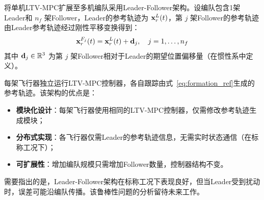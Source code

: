 将单机LTV-MPC扩展至多机编队采用Leader-Follower架构。设编队包含1架Leader和 $n_f$ 架Follower，Leader的参考轨迹为 $\mathbf{x}_{r}^{L}(t)$，第 $j$ 架Follower的参考轨迹由Leader参考轨迹经过刚性平移变换得到：
\begin{equation}\label{eq:formation_ref}
\mathbf{x}_{r}^{F_j}(t) = \mathbf{x}_{r}^{L}(t) + \mathbf{d}_j, \quad j = 1, \ldots, n_f
\end{equation}
其中 $\mathbf{d}_j \in \mathbb{R}^3$ 为第 $j$ 架Follower相对于Leader的期望位置偏移量（在惯性系中定义）。

每架飞行器独立运行LTV-MPC控制器，各自跟踪由式~\eqref{eq:formation_ref}生成的参考轨迹。该架构的优点是：
\begin{itemize}[leftmargin=*]
    \item \textbf{模块化设计}：每架飞行器使用相同的LTV-MPC控制器，仅需修改参考轨迹生成模块；
    \item \textbf{分布式实现}：各飞行器仅需Leader的参考轨迹信息，无需实时状态通信（在标称工况下）；
    \item \textbf{可扩展性}：增加编队规模只需增加Follower数量，控制器结构不变。
\end{itemize}

需要指出的是，Leader-Follower架构在标称工况下表现良好，但当Leader受到扰动时，误差可能沿编队传播。该鲁棒性问题的分析留待未来工作。
